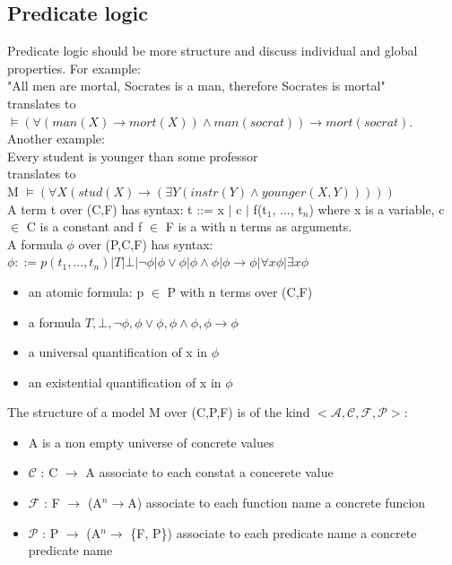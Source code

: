 \documentclass[12pt]{article}
\begin{document}
\subsection{Predicate logic}
Predicate logic should be more structure and discuss individual and global properties.
For example:
\\ "All men are mortal, Socrates is a man, therefore Socrates is mortal"
\\ translates to 
\\ $\models (\forall (man(X) \rightarrow mort(X)) \land man(socrat)) \rightarrow mort(socrat)$.
\\ Another example: 
\\ Every student is younger than some professor 
\\ translates to 
\\ M $\models (\forall X (stud(X) \rightarrow ( \exists Y(instr(Y) \land younger(X,Y)))))$
\\ A term t over (C,F) has syntax: t ::= x $|$ c $|$ f(t$_1$, ..., t$_n$) where x is a variable, c $\in$ C is a constant and f $\in$ F is a with n terms as arguments.
\\ A formula $\phi$ over (P,C,F) has syntax: $\phi ::= p(t_1, ... , t_n) |T| \bot | \neg \phi | \phi \lor \phi | \phi \land \phi | \phi \rightarrow \phi | \forall x \phi | \exists x \phi$ 
\begin{itemize}
    \item an atomic formula: p $\in$ P with n terms over (C,F)
    \item a formula $T, \bot , \neg \phi , \phi \lor \phi , \phi \land \phi , \phi \rightarrow \phi$
    \item a universal quantification of x in $\phi$
    \item an existential quantification of x in $\phi$
\end{itemize}
The structure of a model M over (C,P,F) is of the kind $<\mathcal{A,C,F,P}>$: 
\begin{itemize}
    \item A is a non empty universe of concrete values
    \item $\mathcal{C}$ : C $\rightarrow$ A associate to each constat a concerete value
    \item $\mathcal{F}$ : F $\rightarrow$ (A$^n \rightarrow $A) associate to each function name a concrete funcion
    \item $\mathcal{P}$ : P $\rightarrow$ (A$^n \rightarrow $ \{F, P\}) associate to each predicate name a concrete predicate name
\end{itemize}
\end{document}
